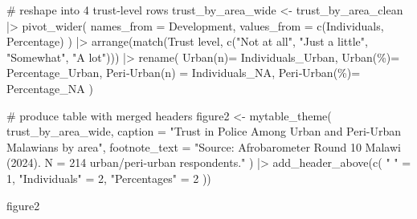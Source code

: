 \documentclass[
  letterpaper,
  DIV=11,
  numbers=noendperiod]{scrartcl}
\newenvironment{Shaded}{\begin{snugshade}}{\end{snugshade}}
\newcommand{\AttributeTok}[1]{\textcolor[rgb]{0.40,0.45,0.13}{#1}}
\newcommand{\CommentTok}[1]{\textcolor[rgb]{0.37,0.37,0.37}{#1}}
\newcommand{\DecValTok}[1]{\textcolor[rgb]{0.68,0.00,0.00}{#1}}
\newcommand{\FunctionTok}[1]{\textcolor[rgb]{0.28,0.35,0.67}{#1}}
\newcommand{\NormalTok}[1]{\textcolor[rgb]{0.00,0.23,0.31}{#1}}
\newcommand{\OtherTok}[1]{\textcolor[rgb]{0.00,0.23,0.31}{#1}}
\newcommand{\SpecialCharTok}[1]{\textcolor[rgb]{0.37,0.37,0.37}{#1}}
\newcommand{\StringTok}[1]{\textcolor[rgb]{0.13,0.47,0.30}{#1}}
\begin{document}
\begin{Shaded}
\begin{Highlighting}[]
\CommentTok{\# reshape into 4 trust{-}level rows}
\NormalTok{trust\_by\_area\_wide }\OtherTok{\textless{}{-}}\NormalTok{ trust\_by\_area\_clean }\SpecialCharTok{|\textgreater{}}
  \FunctionTok{pivot\_wider}\NormalTok{(}
    \AttributeTok{names\_from =}\NormalTok{ Development,}
    \AttributeTok{values\_from =} \FunctionTok{c}\NormalTok{(Individuals, Percentage)}
\NormalTok{  ) }\SpecialCharTok{|\textgreater{}}
  \FunctionTok{arrange}\NormalTok{(}\FunctionTok{match}\NormalTok{(}\StringTok{\textasciigrave{}}\AttributeTok{Trust level}\StringTok{\textasciigrave{}}\NormalTok{,}
                \FunctionTok{c}\NormalTok{(}\StringTok{"Not at all"}\NormalTok{, }\StringTok{"Just a little"}\NormalTok{, }\StringTok{"Somewhat"}\NormalTok{, }\StringTok{"A lot"}\NormalTok{))) }\SpecialCharTok{|\textgreater{}}
  \FunctionTok{rename}\NormalTok{(}
    \StringTok{\textasciigrave{}}\AttributeTok{Urban(n)}\StringTok{\textasciigrave{}}\OtherTok{=}\NormalTok{ Individuals\_Urban,}
    \StringTok{\textasciigrave{}}\AttributeTok{Urban(\%)}\StringTok{\textasciigrave{}}\OtherTok{=}\NormalTok{ Percentage\_Urban,}
    \StringTok{\textasciigrave{}}\AttributeTok{Peri‑Urban(n)}\StringTok{\textasciigrave{}} \OtherTok{=} \StringTok{\textasciigrave{}}\AttributeTok{Individuals\_NA}\StringTok{\textasciigrave{}}\NormalTok{,}
    \StringTok{\textasciigrave{}}\AttributeTok{Peri‑Urban(\%)}\StringTok{\textasciigrave{}}\OtherTok{=} \StringTok{\textasciigrave{}}\AttributeTok{Percentage\_NA}\StringTok{\textasciigrave{}}
\NormalTok{  )}

\CommentTok{\# produce table with merged headers}
\NormalTok{  figure2 }\OtherTok{\textless{}{-}} \FunctionTok{mytable\_theme}\NormalTok{(}
\NormalTok{  trust\_by\_area\_wide,}
  \AttributeTok{caption =} \StringTok{"Trust in Police Among Urban and Peri{-}Urban Malawians by area"}\NormalTok{,}
  \AttributeTok{footnote\_text =} \StringTok{"Source: Afrobarometer Round 10 Malawi (2024). N = 214 urban/peri{-}urban respondents."}
\NormalTok{) }\SpecialCharTok{|\textgreater{}}
  \FunctionTok{add\_header\_above}\NormalTok{(}\FunctionTok{c}\NormalTok{(}
    \StringTok{" "} \OtherTok{=} \DecValTok{1}\NormalTok{,}
    \StringTok{"Individuals"} \OtherTok{=} \DecValTok{2}\NormalTok{,}
    \StringTok{"Percentages"} \OtherTok{=} \DecValTok{2}
\NormalTok{  ))}
  
\NormalTok{figure2}
\end{Highlighting}
\end{Shaded}
\end{document}
